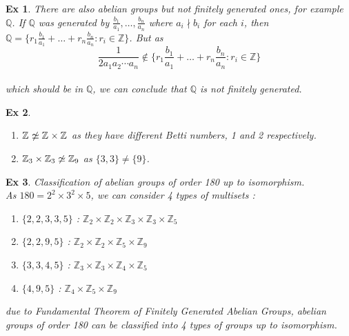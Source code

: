\documentclass[paper=a4, fontsize=11pt]{scrartcl}
\newcommand{\Zn}[1]{\mathbb{Z}_{#1}}
\newcommand{\nextline}{$ $ \newline \vspace{-0.15in}}
\newtheorem{example}{Ex}
\begin{document}
\begin{example}
	There are also abelian groups but not finitely generated ones, for example $\mathbb{Q}$. If $\mathbb{Q}$ was generated by $\frac{b_1}{a_1},\dots,\frac{b_n}{a_n}$ where $a_i \nmid b_i$ for each $i$, then $\mathbb{Q} = \{ r_1 \frac{b_1}{a_1} + \dots + r_n \frac{b_n}{a_n} : r_i \in \mathbb{Z }\}$. But as \\
	\begin{equation}\nonumber
		\frac{1}{2a_1 a_2 \cdots a_n} \notin  \{ r_1 \frac{b_1}{a_1} + \dots + r_n \frac{b_n}{a_n} : r_i \in \mathbb{Z }\}
	\end{equation}\\
	which should be in $\mathbb{Q}$, we can conclude that $\mathbb{Q}$ is not finitely generated.\\
\end{example}

\begin{example}
\nextline
\begin{enumerate}
	\item $\Zn{} \centernot \simeq \Zn{}\times \Zn{}$ as they have different Betti numbers, 1 and 2 respectively.
	\item $\Zn{3} \times \Zn{3} \centernot \simeq \Zn{9}$ as $\{3,3\} \neq \{9\}$.\\
\end{enumerate}
\end{example}

\begin{example}
	Classification of abelian groups of order 180 up to isomorphism. \\[0.15in]
	As $180=2^2 \times 3^2 \times 5$, we can consider 4 types of multisets :\\
	\begin{enumerate}
		\item $\{2,2,3,3,5\}$ : $\Zn{2}\times\Zn{2}\times\Zn{3}\times\Zn{3}\times\Zn{5}$
		\item $\{2,2,9,5\}$ : $\Zn{2}\times\Zn{2}\times\Zn{5}\times\Zn{9}$
		\item $\{3,3,4,5\}$ : $\Zn{3}\times\Zn{3}\times\Zn{4}\times\Zn{5}$
		\item $\{4,9,5\}$ : $\Zn{4}\times\Zn{5}\times\Zn{9}$\\
	\end{enumerate}
	due to Fundamental Theorem of Finitely Generated Abelian Groups, abelian groups of order 180 can be classified into 4 types of groups up to isomorphism.\\
\end{example}
\end{document}
